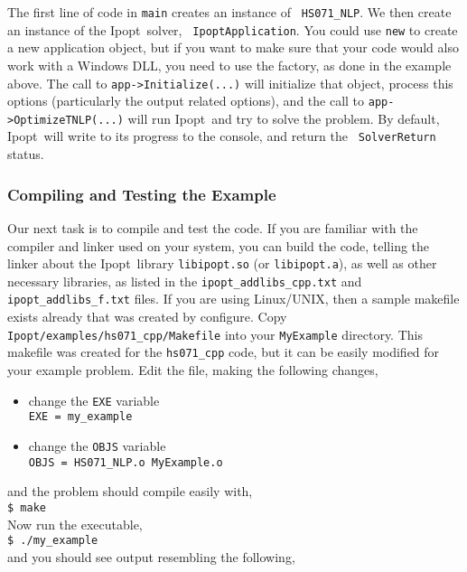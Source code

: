 \documentclass[10pt]{article}
\newcommand{\Ipopt}{{\sc Ipopt}}
\begin{document}
The first line of code in {\tt main} creates an instance of {\tt
  HS071\_NLP}. We then create an instance of the \Ipopt\ solver, {\tt
  IpoptApplication}. You could use \texttt{new} to create a new
application object, but if you want to make sure that your code would
also work with a Windows DLL, you need to use the factory, as done in
the example above. The call to {\tt app->Initialize(...)} will
initialize that object, process this options (particularly the output
related options), and the call to {\tt app->OptimizeTNLP(...)}  will
run \Ipopt\ and try to solve the problem. By default, \Ipopt\ will
write to its progress to the console, and return the {\tt
  SolverReturn} status.

\subsubsection{Compiling and Testing the Example}
Our next task is to compile and test the code. If you are familiar
with the compiler and linker used on your system, you can build the
code, telling the linker about the \Ipopt\ library {\tt libipopt.so}
(or {\tt libipopt.a}), as well as other necessary libraries, as listed
in the {\tt ipopt\_addlibs\_cpp.txt} and {\tt ipopt\_addlibs\_f.txt}
files.  If you are using Linux/UNIX, then a sample makefile exists
already that was created by configure.  Copy {\tt
  Ipopt/examples/hs071\_cpp/Makefile} into your {\tt MyExample}
directory.  This makefile was created for the {\tt hs071\_cpp} code,
but it can be easily modified for your example problem. Edit the file,
making the following changes,

\begin{itemize}
\item change the {\tt EXE} variable \\
{\tt EXE = my\_example}
\item change the {\tt OBJS} variable \\
{\tt OBJS = HS071\_NLP.o MyExample.o}
\end{itemize}
and the problem should compile easily with, \\
{\tt \$ make} \\
Now run the executable,\\ 
{\tt \$ ./my\_example} \\
and you should see output resembling the following,
\end{document}
